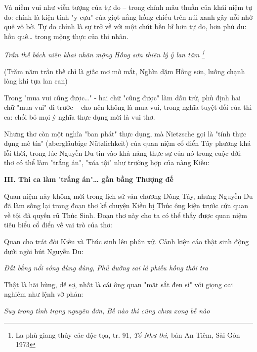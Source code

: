 \documentclass[../main.tex]{subfiles}
\begin{document}
\begin{multicols}{2}
Và niềm vui như viễn tượng của tự do – trong chính mâu thuẫn của khái niệm tự do: chính là kiện tính "y cựu" của giọt nắng hồng chiếu trên núi xanh gây nỗi nhớ quê vô bờ. Tự do chính là sự trở về với một chút bền bĩ hơn tự do, hơn phù du: hồn quê… trong mộng thực của thi nhân.  
\begin{blockquote}
        
\textit{Trần thế bách niên khai nhãn mộng}        
\textit{Hồng sơn thiên lý ỷ lan tâm \footnote{
La phù giang thủy các độc tọa, tr. 91, \textit{Tố Như thi}, bản An Tiêm, Sài Gòn 1973} } 
        
(Trăm năm trần thế chỉ là giấc mơ mở mắt,        
Nghìn dặm Hồng sơn, luống chạnh lòng khi tựa lan can) 

\end{blockquote}
 
Trong "mua vui cũng được…" - hai chữ "cũng được" làm dấu trừ, phủ định hai chữ "mua vui" đi trước – cho nên không là mua vui, trong nghĩa tuyệt đối của thi ca: chối bỏ mọi ý nghĩa thực dụng mới là vui thơ. 
 
Nhưng thơ còn một nghĩa "ban phát" thực dụng, mà Nietzsche gọi là "tính thực dụng mê tín" (abergläubige Nützlichkeit) của quan niệm cổ điển Tây phương khá lỗi thời, trong lúc Nguyễn Du tin vào khả năng thực sự của nó trong cuộc đời: thơ có thể làm "trắng án", "xóa tội" như trường hợp của nàng Kiều: 
 
 
\textbf{III. Thi ca làm }"\textbf{trắng án}"\textbf{… gần bằng Thượng đế } 
 
Quan niệm này không mới trong lịch sử văn chương Đông Tây, nhưng Nguyễn Du đã làm sống lại trong đoạn thơ kể chuyện Kiều bị Thúc ông kiện trước cửa quan về tội đã quyến rũ Thúc Sinh. Đoạn thơ này cho ta có thể thấy được quan niệm tiêu biểu cổ điển về vai trò của thơ: 
 
Quan cho trát đòi Kiều và Thúc sinh lên phân xử. Cảnh kiện cáo thật sinh động dưới ngòi bút Nguyễn Du: 
\begin{blockquote}
        
\textit{Đất bằng nổi sóng đùng đùng,}        
\textit{Phủ đường sai lá phiếu hồng thôi tra} 

\end{blockquote}
 
Thật là hãi hùng, dễ sợ, nhất là cái ông quan "mặt sắt đen sì" với giọng oai nghiêm như lệnh vỡ phán: 
\begin{blockquote}
        
\textit{Suy trong tình trạng nguyên đơn,} 
\textit{Bề nào thì cũng chưa xong bề nào} 


\end{blockquote}
\end{multicols}
\end{document}
